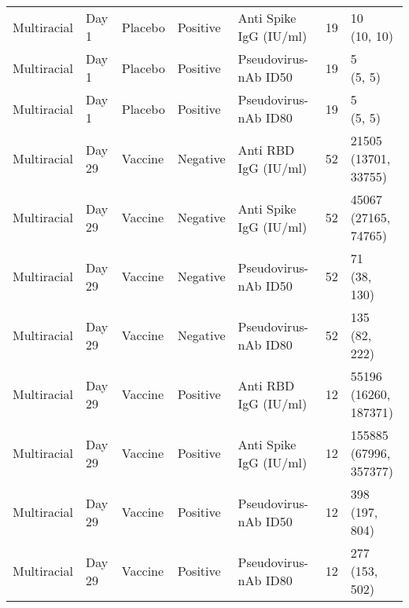 \documentclass[]{book}
\theoremstyle{definition}
\theoremstyle{definition}
\theoremstyle{definition}
\newcommand{\1}{\mathbbm{1}}
\begin{document}
\begin{landscape}
\begin{ThreePartTable}
\begin{longtable}[t]{>{\raggedright\arraybackslash}p{7cm}llllll}
\hspace{1em}Multiracial & Day 1 & Placebo & Positive & Anti Spike IgG (IU/ml) & 19 & \makecell[l]{10\\(10, 10)}\\
\hspace{1em}Multiracial & Day 1 & Placebo & Positive & Pseudovirus-nAb ID50 & 19 & \makecell[l]{5\\(5, 5)}\\
\hspace{1em}Multiracial & Day 1 & Placebo & Positive & Pseudovirus-nAb ID80 & 19 & \makecell[l]{5\\(5, 5)}\\
\hspace{1em}Multiracial & Day 29 & Vaccine & Negative & Anti RBD IgG (IU/ml) & 52 & \makecell[l]{21505\\(13701, 33755)}\\
\hspace{1em}Multiracial & Day 29 & Vaccine & Negative & Anti Spike IgG (IU/ml) & 52 & \makecell[l]{45067\\(27165, 74765)}\\
\hspace{1em}Multiracial & Day 29 & Vaccine & Negative & Pseudovirus-nAb ID50 & 52 & \makecell[l]{71\\(38, 130)}\\
\hspace{1em}Multiracial & Day 29 & Vaccine & Negative & Pseudovirus-nAb ID80 & 52 & \makecell[l]{135\\(82, 222)}\\
\hspace{1em}Multiracial & Day 29 & Vaccine & Positive & Anti RBD IgG (IU/ml) & 12 & \makecell[l]{55196\\(16260, 187371)}\\
\hspace{1em}Multiracial & Day 29 & Vaccine & Positive & Anti Spike IgG (IU/ml) & 12 & \makecell[l]{155885\\(67996, 357377)}\\
\hspace{1em}Multiracial & Day 29 & Vaccine & Positive & Pseudovirus-nAb ID50 & 12 & \makecell[l]{398\\(197, 804)}\\
\hspace{1em}Multiracial & Day 29 & Vaccine & Positive & Pseudovirus-nAb ID80 & 12 & \makecell[l]{277\\(153, 502)}\\

\end{longtable}
\end{ThreePartTable}
\end{landscape}
\end{document}
